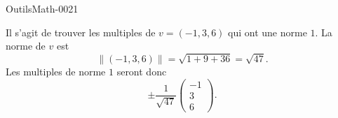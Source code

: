 
\begin{corrige}{OutilsMath-0021}

	Il s'agit de trouver les multiples de $v=(-1,3,6)$ qui ont une norme $1$. La norme de $v$ est
	\begin{equation}
		\| (-1,3,6) \|=\sqrt{1+9+36}=\sqrt{47}.
	\end{equation}
	Les multiples de norme $1$ seront donc
	\begin{equation}
		\pm\frac{1}{ \sqrt{47} }\begin{pmatrix}
			-1	\\ 
			3	\\ 
			6	
		\end{pmatrix}.
	\end{equation}

\end{corrige}
